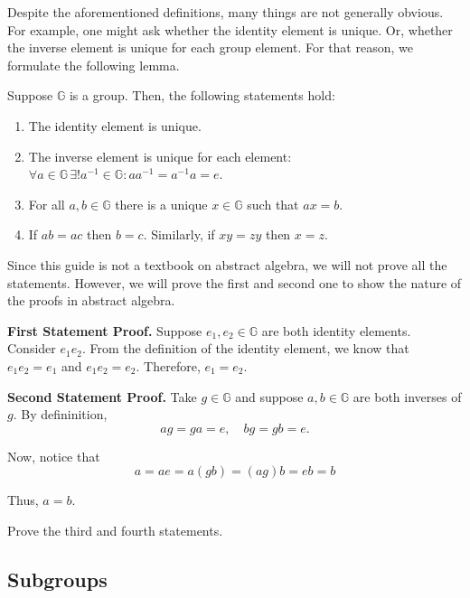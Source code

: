 \documentclass[../lecture-notes.tex]{subfiles}
\begin{document}
Despite the aforementioned definitions, many things are not generally obvious. For example, one might ask whether the identity element is unique. Or, 
whether the inverse element is unique for each group element. For that reason, we formulate the following lemma.

\begin{lemma}
    Suppose $\mathbb{G}$ is a group. Then, the following statements hold:
    \begin{enumerate}
        \item The identity element is unique.
        \item The inverse element is unique for each element: $\forall a \in \mathbb{G} \, \exists! a^{-1} \in \mathbb{G}: aa^{-1} = a^{-1}a = e$.
        \item For all $a,b \in \mathbb{G}$ there is a unique $x \in \mathbb{G}$ such that $ax = b$.
        \item If $ab=ac$ then $b=c$. Similarly, if $xy=zy$ then $x=z$.
    \end{enumerate}
\end{lemma}

Since this guide is not a textbook on abstract algebra, we will not prove all the statements. However, we will prove the first and second one to show the nature of the proofs in abstract algebra.

\textbf{First Statement Proof.} Suppose $e_1,e_2 \in \mathbb{G}$ are both identity elements. Consider $e_1e_2$. From the definition of the identity element, we know that $e_1e_2 = e_1$ and $e_1e_2 = e_2$. Therefore, $e_1 = e_2$.

\textbf{Second Statement Proof.} Take $g \in \mathbb{G}$ and suppose $a,b \in \mathbb{G}$ are both inverses of $g$. By defininition,
\begin{equation}
    ag = ga = e, \quad bg = gb = e.
\end{equation}

Now, notice that
\begin{equation}
    a = ae = a (gb) = (a g) b = e b = b
\end{equation}

Thus, $a = b$.

\begin{exercise}
    Prove the third and fourth statements.
\end{exercise}

\subsection{Subgroups}
\end{document}
